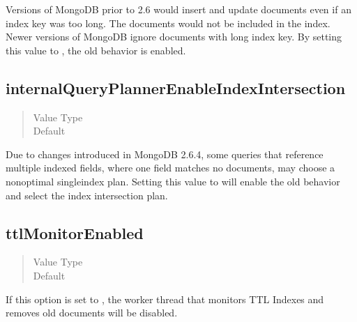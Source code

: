\documentclass[letterpaper,10pt,english]{sphinxmanual}
\begin{document}
\sphinxAtStartPar
Versions of MongoDB prior to 2.6 would insert and update documents
even if an index key was too long.
The documents would not be included in the index.
Newer versions of MongoDB ignore documents with long index key.
By setting this value to , the old behavior is enabled.


\subsection{internalQueryPlannerEnableIndexIntersection}
\label{\detokenize{set-parameter:internalqueryplannerenableindexintersection}}\begin{quote}\begin{description}
\item[{Value Type}] \leavevmode
\sphinxAtStartPar
{}

\item[{Default}] \leavevmode
\sphinxAtStartPar
{}

\end{description}\end{quote}

\sphinxAtStartPar
Due to changes introduced in MongoDB 2.6.4,
some queries that reference multiple indexed fields,
where one field matches no documents,
may choose a non\sphinxhyphen{}optimal single\sphinxhyphen{}index plan.
Setting this value to  will enable the old behavior
and select the index intersection plan.


\subsection{ttlMonitorEnabled}
\label{\detokenize{set-parameter:ttlmonitorenabled}}\begin{quote}\begin{description}
\item[{Value Type}] \leavevmode
\sphinxAtStartPar
{}

\item[{Default}] \leavevmode
\sphinxAtStartPar
{}

\end{description}\end{quote}

\sphinxAtStartPar
If this option is set to ,
the worker thread that monitors TTL Indexes and removes old documents
will be disabled.
\end{document}
